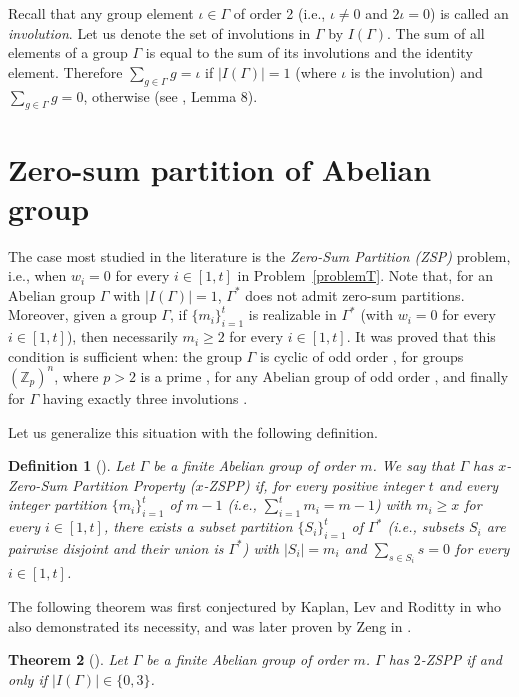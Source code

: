 \documentclass{article}
\newcommand{\zet}{\mathbb{Z}}
\newtheorem{thm}{Theorem}[section]
\newtheorem{dfn}[thm]{Definition}
\begin{document}
 Recall that any group element $\iota\in\Gamma$ of order 2 (i.e., $\iota\neq 0$ and $2\iota=0$) is called an \emph{involution}. Let us denote the set of involutions in $\Gamma$ by $I(\Gamma)$. The sum of all elements of a group $\Gamma$ is equal to the sum of its involutions and the identity element.
Therefore $\sum_{g\in \Gamma}g= \iota$ if $|I(\Gamma)|=1$
 (where $\iota$ is the involution) and $\sum_{g\in \Gamma}g= 0$, otherwise (see \cite{ref_ComNelPal}, Lemma 8).
 


\section{Zero-sum partition of Abelian group}
The case most studied in the literature is the {\em Zero-Sum Partition (ZSP)} problem, i.e., when $w_i=0$ for every  {$i\in[1,t]$} in Problem~\ref{problemT}. Note that,
 for an Abelian group $\Gamma$ with $|I(\Gamma)|=1$, $\Gamma^*$ does not admit zero-sum partitions. Moreover, given a group $\Gamma$, if $\{m_i\}_{i=1}^t$ is realizable in $\Gamma^*$ (with $w_i=0$ for every {$i\in[1,t]$}), then necessarily $m_i\geq 2$ for every {$i\in[1,t]$}. It was proved that this condition is sufficient when:
 the group $\Gamma$ is cyclic of odd order  \cite{FrieGorTan,KLR}, for groups $(\zet_p)^n$, where $p>2$ is a prime \cite{Fukuchi},  for any Abelian group of odd order  \cite{Tannenbaum1,Zeng}, and finally for $\Gamma$ having exactly three involutions \cite{Zeng}.
 
  Let us generalize this situation with the following definition.

\begin{dfn}[\cite{CicrSuch}]Let $\Gamma$ be a finite Abelian group of order $m$. We say that $\Gamma$ has {\em $x$-Zero-Sum Partition Property ($x$-ZSPP)} if, for every positive integer $t$ and every integer partition $\{m_i\}_{i=1}^t$ of $m-1$ (i.e., $\sum_{i=1}^t m_i=m-1$) with $m_i \geq x$ for every  {$i\in[1,t]$}, there exists a subset partition $\{S_i\}_{i=1}^t$ of $\Gamma^*$ (i.e., subsets $S_i$ are pairwise disjoint and their union is $ \Gamma^*$) with $|S_i| = m_i$ and $\sum_{s\in S_i}s = 0$ for every {$i\in[1,t]$}. %
\end{dfn}

The following theorem was first conjectured by Kaplan,  Lev and Roditty in \cite{KLR} who also demonstrated its necessity, and was later proven by Zeng in \cite{Zeng}.
\begin{thm}[\cite{Zeng}]\label{Zeng}Let $\Gamma$ be a finite Abelian group of order $m$. $\Gamma$ has $2$-ZSPP if and only if $|I(\Gamma)|\in\{0,3\}$. 
\end{thm}
\end{document}
